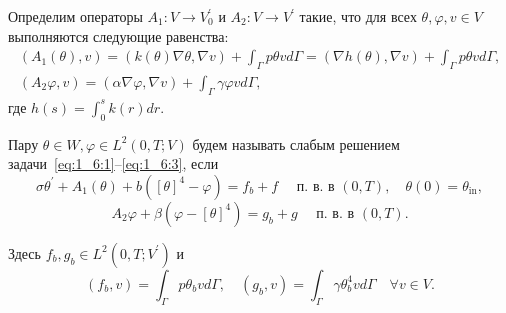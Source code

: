 \begin{frame}
    Определим операторы $A_{1}: V \rightarrow V_{0}^{\prime}$ и $A_{2}: V \rightarrow V^{\prime}$
    такие, что для всех $\theta, \varphi, v \in V$ выполняются следующие равенства:
    \[
        \begin{gathered}
            \left(A_{1}(\theta), v\right)=(k(\theta) \nabla \theta, \nabla v)
            +\int_{\Gamma} p \theta v d \Gamma=(\nabla h(\theta), \nabla v)
            +\int_{\Gamma} p \theta v d \Gamma, \\
            \left(A_{2} \varphi, v\right)=(\alpha \nabla \varphi, \nabla v)
            +\int_{\Gamma} \gamma \varphi v d \Gamma,
        \end{gathered}
    \]
    где $ h(s)=\int_{0}^{s} k(r) d r$.


    \begin{definition}
        Пару $\theta \in W, \varphi \in L^{2}(0, T ; V)$ будем называть слабым
        решением задачи~\eqref{eq:1_6:1}--\eqref{eq:1_6:3}, если
        \begin{equation}
            \label{eq:1_6:4}
            \sigma \theta^{\prime}+A_{1}(\theta)+b\left([\theta]^{4}-\varphi\right)=f_{b}+f
            \quad \text { п. в. в }(0, T), \quad \theta(0)=\theta_{\text{in}},
        \end{equation}
        \begin{equation}
            \label{eq:1_6:5}
            A_{2} \varphi+\beta\left(\varphi-[\theta]^{4}\right)
            =g_{b}+g \quad \text { п. в. в }(0, T).
        \end{equation}
    \end{definition}
    Здесь $f_{b}, g_{b} \in L^{2}\left(0, T ; V^{\prime}\right)$ и
    \[
        \left(f_{b}, v\right)=\int_{\Gamma} p \theta_{b} v d \Gamma,
        \quad\left(g_{b}, v\right)=
        \int_{\Gamma} \gamma \theta_{b}^{4} v d \Gamma \quad \forall v \in V.
    \]
\end{frame}


